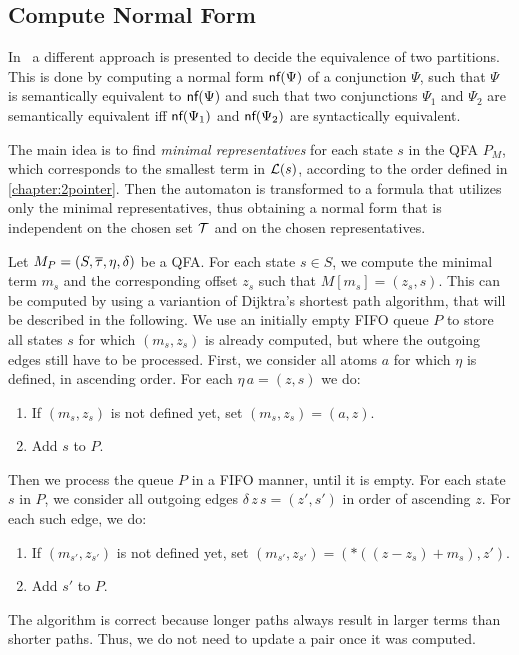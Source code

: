 \subsection{Compute Normal Form}

In~\cite{2pointer} a different approach is presented to decide the equivalence of two partitions.
This is done by computing a normal form $\textsf{nf}(\Psi)$ of a conjunction $\Psi$, such that $\Psi$ is semantically equivalent to $\textsf{nf}(\Psi)$ and such that two conjunctions $\Psi_1$ and $\Psi_2$ are semantically equivalent iff $\textsf{nf}(\Psi_1)$ and $\textsf{nf}(\Psi_2)$ are syntactically equivalent.

The main idea is to find \emph{minimal representatives} for each state $s$ in the QFA $P_M$,
which corresponds to the smallest term in $\mathcal{L}(s)$, according to the order defined in \cref{chapter:2pointer}.
Then the automaton is transformed to a formula that utilizes only the minimal representatives, thus obtaining a normal form
that is independent on the chosen set $\mathcal{T}$ and on the chosen representatives.

Let $M_P = (S, \overline{\tau}, \eta, \delta)$ be a QFA.\@
For each state $s \in S$, we compute the minimal term $m_s$ and the corresponding offset $z_s$ such that $M[m_s] = (z_s,s)$.
This can be computed by using a variantion of Dijktra's shortest path algorithm,
that will be described in the following.
We use an initially empty FIFO queue $P$ to store all states $s$ for which $(m_s,z_s)$ is already computed,
but where the outgoing edges still have to be processed.
First, we consider all atoms $a$ for which $\eta$ is defined, in ascending order. For each $\eta\,a = (z,s)$ we do:
\begin{enumerate}
    \item If $(m_s,z_s)$ is not defined yet, set $(m_s,z_s) = (a,z)$.
    \item Add $s$ to $P$.
\end{enumerate}
Then we process the queue $P$ in a FIFO manner, until it is empty.
For each state $s$ in $P$, we consider all outgoing edges $\delta\,z\,s = (z',s')$ in order of ascending $z$.
For each such edge, we do:
\begin{enumerate}
    \item If $(m_{s'},z_{s'})$ is not defined yet, set $(m_{s'},z_{s'}) = (*((z-z_s)+m_s),z')$.
    \item Add $s'$ to $P$.
\end{enumerate}
The algorithm is correct because longer paths always result in larger terms than shorter paths.
Thus, we do not need to update a pair once it was computed.


